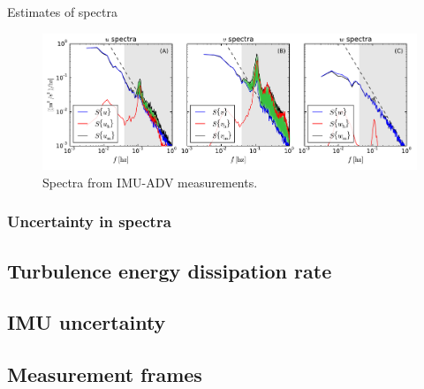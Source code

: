\documentclass[twocol]{ametsoc}
\begin{document}
Estimates of spectra 

\begin{figure}[t]
  \centering
  \includegraphics[width=6
in]{SpecFig02_annot}
  \caption{Spectra from IMU-ADV measurements.}
  \label{fig:spec01}
\end{figure}

\subsubsection{Uncertainty in spectra}

\subsection{Turbulence energy dissipation rate}


\acknowledgments


\clearpage %

\appendix


\def\Amat\ensuremath{}

\subsection{IMU uncertainty}\label{apdx:imu-uncertainty}

\subsection{Measurement frames}\label{apdx:coord-sys:meas}\label{apdx:coord-sys}

\def\a{\ensuremath{\mathrm{a}}}
\def\b{\ensuremath{\mathrm{b}}}
\def\lab{\ensuremath{l_\b^\a}}
\def\xa{\ensuremath{\vec{r}^\a}}
\def\xb{\ensuremath{\vec{r}^\b}}
\def\Rba{\ensuremath{\mathbf{R}^\a_\b}}
\end{document}
